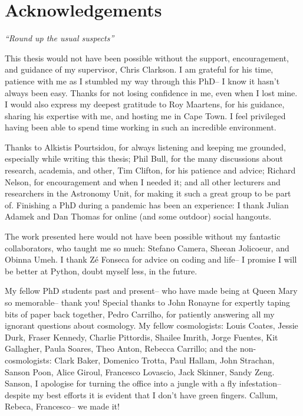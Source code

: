 \chapter*{Acknowledgements}
\label{ch:acknowledgements}

\begin{flushright}
{\footnotesize \textit {``Round up the usual suspects''}}
\end{flushright}

This thesis would not have been possible without the support, encouragement, and guidance of my supervisor, Chris Clarkson. I am grateful for his time, patience with me as I stumbled my way through this PhD-- I know it hasn't always been easy. Thanks for not losing confidence in me, even when I lost mine. I would also express my deepest gratitude to Roy Maartens, for his guidance, sharing his expertise with me, and hosting me in Cape Town. I feel privileged having been able to spend time working in such an incredible environment.

Thanks to Alkistis Pourtsidou, for always listening and keeping me grounded, especially while writing this thesis; Phil Bull, for the many discussions about research, academia, and other, Tim Clifton, for his patience and advice; Richard Nelson, for encouragement and when I needed it; and all other lecturers and researchers in the Astronomy Unit, for making it such a great group to be part of. Finishing a PhD during a pandemic has been an experience: I thank Julian Adamek and Dan Thomas for online (and some outdoor) social hangouts.

The work presented here would not have been possible without my fantastic collaborators, who taught me so much: Stefano Camera, Sheean Jolicoeur, and Obinna Umeh. I thank Z\'e Fonseca for advice on coding and life-- I promise I will be better at Python, doubt myself less, in the future. 

My fellow PhD students past and present-- who have made being at Queen Mary so memorable-- thank you! Special thanks to John Ronayne for expertly taping bits of paper back together, Pedro Carrilho, for patiently answering all my ignorant questions about cosmology. My fellow cosmologists: Louis Coates, Jessie Durk, Fraser Kennedy, Charlie Pittordis, Shailee Imrith, Jorge Fuentes, Kit Gallagher, Paula Soares, Theo Anton, Rebecca Carrillo; and the non-cosmologists: Clark Baker, Domenico Trotta, Paul Hallam, John Strachan, Sanson Poon, Alice Giroul, Francesco Lovascio, Jack Skinner, Sandy Zeng. Sanson, I apologise for turning the office into a jungle with a fly infestation-- despite my best efforts it is evident that I don't have green fingers. Callum, Rebeca, Francesco-- we made it!

